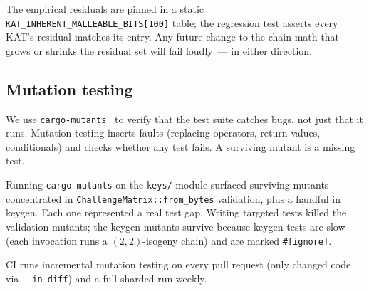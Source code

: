 The empirical residuals are pinned in a static
\texttt{KAT\_INHERENT\_MALLEABLE\_BITS[100]} table; the regression
test asserts every KAT's residual matches its entry.  Any future
change to the chain math that grows or shrinks the residual set
will fail loudly~--- in either direction.

\subsection{Mutation testing}

We use \texttt{cargo-mutants}~\cite{cargo-mutants} to verify that
the test suite catches bugs, not just that it runs.  Mutation testing
inserts faults (replacing operators, return values, conditionals) and
checks whether any test fails.  A surviving mutant is a missing test.

Running \texttt{cargo-mutants} on the \texttt{keys/} module
surfaced surviving mutants concentrated in
\texttt{ChallengeMatrix::from\_bytes} validation, plus a handful
in keygen.  Each one represented a real test gap.  Writing targeted
tests killed the validation mutants; the keygen mutants survive
because keygen tests are slow (each invocation runs a
$(2,2)$-isogeny chain) and are marked \texttt{\#[ignore]}.

CI runs incremental mutation testing on every pull request (only
changed code via \texttt{-{}-in-diff}) and a full sharded run weekly.
